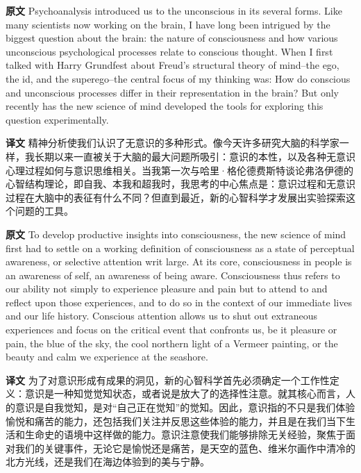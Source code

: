 \documentclass[UTF8]{ctexart}
\newenvironment{english}{\par\small\noindent\textbf{原文}\quad\ignorespaces}{\par}
\newenvironment{zhtranslation}{\par\noindent\textbf{译文}\quad\ignorespaces}{\par\vspace{0.35em}}
\begin{document}
\begin{english}
Psychoanalysis introduced us to the unconscious in its several forms. Like many scientists now working on the brain, I have long been intrigued by the biggest question about the brain: the nature of consciousness and how various unconscious psychological processes relate to conscious thought. When I first talked with Harry Grundfest about Freud's structural theory of mind--the ego, the id, and the superego--the central focus of my thinking was: How do conscious and unconscious processes differ in their representation in the brain? But only recently has the new science of mind developed the tools for exploring this question experimentally.
\end{english}
\begin{zhtranslation}
精神分析使我们认识了无意识的多种形式。像今天许多研究大脑的科学家一样，我长期以来一直被关于大脑的最大问题所吸引：意识的本性，以及各种无意识心理过程如何与意识思维相关。当我第一次与哈里·格伦德费斯特谈论弗洛伊德的心智结构理论，即自我、本我和超我时，我思考的中心焦点是：意识过程和无意识过程在大脑中的表征有什么不同？但直到最近，新的心智科学才发展出实验探索这个问题的工具。\end{zhtranslation}

\begin{english}
To develop productive insights into consciousness, the new science of mind first had to settle on a working definition of consciousness as a state of perceptual awareness, or selective attention writ large. At its core, consciousness in people is an awareness of self, an awareness of being aware. Consciousness thus refers to our ability not simply to experience pleasure and pain but to attend to and reflect upon those experiences, and to do so in the context of our immediate lives and our life history. Conscious attention allows us to shut out extraneous experiences and focus on the critical event that confronts us, be it pleasure or pain, the blue of the sky, the cool northern light of a Vermeer painting, or the beauty and calm we experience at the seashore.
\end{english}
\begin{zhtranslation}
为了对意识形成有成果的洞见，新的心智科学首先必须确定一个工作性定义：意识是一种知觉觉知状态，或者说是放大了的选择性注意。就其核心而言，人的意识是自我觉知，是对“自己正在觉知”的觉知。因此，意识指的不只是我们体验愉悦和痛苦的能力，还包括我们关注并反思这些体验的能力，并且是在我们当下生活和生命史的语境中这样做的能力。意识注意使我们能够排除无关经验，聚焦于面对我们的关键事件，无论它是愉悦还是痛苦，是天空的蓝色、维米尔画作中清冷的北方光线，还是我们在海边体验到的美与宁静。\end{zhtranslation}
\end{document}
